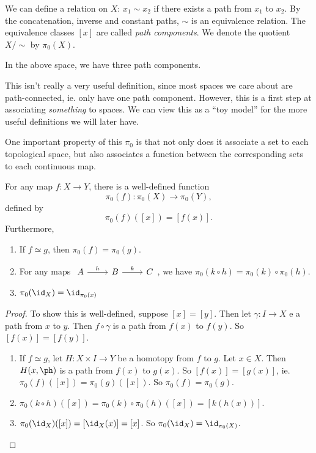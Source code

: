 \documentclass[a4paper]{article}
\begin{document}
\begin{defi}
  We can define a relation on $X$: $x_1 \sim x_2$ if there exists a path from $x_1$ to $x_2$. By the concatenation, inverse and constant paths, $\sim$ is an equivalence relation. The equivalence classes $[x]$ are called \emph{path components}. We denote the quotient $X/{\sim}$ by $\pi_0(X)$.
\end{defi}
\begin{center}
\end{center}
In the above space, we have three path components.

This isn't really a very useful definition, since most spaces we care about are path-connected, ie. only have one path component. However, this is a first step at associating \emph{something} to spaces. We can view this as a ``toy model'' for the more useful definitions we will later have.

One important property of this $\pi_0$ is that not only does it associate a set to each topological space, but also associates a function between the corresponding sets to each continuous map.
\begin{prop}
  For any map $f: X\to Y$, there is a well-defined function
  \[
    \pi_0(f): \pi_0(X) \to \pi_0(Y),
  \]
  defined by
  \[
    \pi_0(f)([x]) = [f(x)].
  \]
  Furthermore,
  \begin{enumerate}
    \item If $f\simeq g$, then $\pi_0(f) = \pi_0(g)$.
    \item For any maps $\begin{tikzcd} A \ar[r, "h"] & B\ar[r, "k"] & C\end{tikzcd}$, we have $\pi_0(k\circ h) = \pi_0(k)\circ \pi_0 (h)$.
    \item $\pi_0(\id_X) = \id_{\pi_0(x)}$
  \end{enumerate}
\end{prop}

\begin{proof}
  To show this is well-defined, suppose $[x] = [y]$. Then let $\gamma: I \to X$ e a path from $x$ to $y$. Then $f \circ \gamma$ is a path from $f(x)$ to $f(y)$. So $[f(x)] = [f(y)]$.
  \begin{enumerate}
    \item If $f \simeq g$, let $H: X \times I \to Y$ be a homotopy from $f$ to $g$. Let $x \in X$. Then $H(x, \ph)$ is a path from $f(x)$ to $g(x)$. So $[f(x)] = [g(x)]$, ie. $\pi_0(f)([x]) = \pi_0(g)([x])$. So $\pi_0(f) = \pi_0(g)$.
    \item $\pi_0(k \circ h)([x]) = \pi_0(k) \circ \pi_0(h)([x]) = [k(h(x))]$.
    \item $\pi_0(\id_X)([x]) = [\id_X(x)] = [x]$. So $\pi_0(\id_X) = \id_{\pi_0(X)}$.
  \end{enumerate}
\end{proof}
\end{document}

